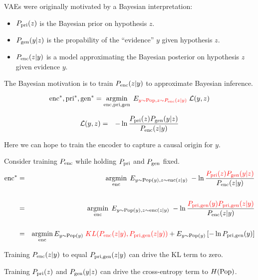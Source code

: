 {

VAEs were originally motivated by a Bayesian interpretation:

\vfill
\begin{itemize}
\item $P_{\mathrm{pri}}(z)$ is the Bayesian prior on hypothesis $z$.

\vfill
\item $P_{\mathrm{gen}}(y|z)$ is the propability of the ``evidence'' $y$ given hypothesis $z$.

\vfill
\item $P_{\mathrm{enc}}(z|y)$ is a model approximating the Bayesian posterior on hypothesis $z$ given evidence $y$.
\end{itemize}

\vfill
The Bayesian motivation is to train $P_{\mathrm{enc}}(z|y)$ to approximate Bayesian inference.


$$\mathrm{enc}^*,\mathrm{pri}^*,\mathrm{gen}^* = \operatorname*{argmin}_{\mathrm{enc},\mathrm{pri},\mathrm{gen}}\;E_{\color{red} y \sim \mathrm{Pop},z\sim P_{\mathrm{enc}}(z|y)}\;{\cal L}(y,z)$$

\vfill
\begin{eqnarray*}
{\cal L}(y,z) & = & - \ln \frac{P_{\mathrm{pri}}(z)P_{\mathrm{gen}}(y|z)}{P_{\mathrm{enc}}(z|y)}
\end{eqnarray*}

\vfill
Here we can hope to train the encoder to capture a causal origin for $y$.


{\huge
Consider training $P_{\mathrm{enc}}$ while holding $P_{\mathrm{pri}}$ and $P_{\mathrm{gen}}$ fixed.
\begin{eqnarray*}
  \mathrm{enc}^* & = & \operatorname*{argmin}_{\mathrm{enc}} \;E_{y \sim \mathrm{Pop}(y),z \sim \mathrm{enc}(z|y)}\; - \ln \frac{\color{red} P_{\mathrm{pri}}(z)P_{\mathrm{gen}}(y|z)}{P_{\mathrm{enc}}(z|y)} \\
  \\
  & = & \operatorname*{argmin}_{\mathrm{enc}} \;E_{y \sim \mathrm{Pop}(y),z \sim \mathrm{enc}(z|y)}\; - \ln \frac{\color{red} P_{\mathrm{pri},\mathrm{gen}}(y)P_{\mathrm{pri},\mathrm{gen}}(z|y)}{P_{\mathrm{enc}}(z|y)} \\
  \\
  &= & \operatorname*{argmin}_{\mathrm{enc}} E_{y \sim \mathrm{Pop}(y)} \; {\color{red} KL(P_{\mathrm{enc}}(z|y),P_{\mathrm{pri},\mathrm{gen}}(z|y))} + E_{y\sim \mathrm{Pop}(y)}\left[-\ln P_{\mathrm{pri},\mathrm{gen}}(y)\right]
  \end{eqnarray*}

\vfill
Training $P_{\mathrm{enc}}(z|y)$ to equal $P_{\mathrm{pri},\mathrm{gen}}(z|y)$ can drive the KL term to zero.

\vfill
Training $P_{\mathrm{pri}}(z)$ and $P_{\mathrm{gen}}(y|z)$ can drive the cross-entropy term to $H(\mathrm{Pop})$.
}


}
